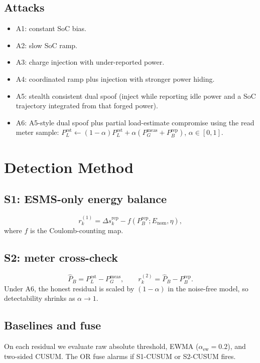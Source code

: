 \documentclass[conference]{IEEEtran}
\begin{document}
\subsection{Attacks}
\begin{itemize}
\item A1: constant SoC bias.
\item A2: slow SoC ramp.
\item A3: charge injection with under-reported power.
\item A4: coordinated ramp plus injection with stronger power hiding.
\item A5: stealth consistent dual spoof (inject while reporting idle power and a SoC trajectory integrated from that forged power).
\item A6: A5-style dual spoof plus partial load-estimate compromise using the read meter sample:
$P_L^{\mathrm{est}}\leftarrow(1-\alpha)P_L^{\mathrm{est}}+\alpha(P_G^{\mathrm{meas}}+P_B^{\mathrm{rep}})$, $\alpha\in[0,1]$.
\end{itemize}

\section{Detection Method}
\subsection{S1: ESMS-only energy balance}
\begin{equation}
r^{(1)}_k = \Delta s^{\mathrm{rep}}_k - f(P_B^{\mathrm{rep}}; E_{\mathrm{nom}},\eta),
\end{equation}
where $f$ is the Coulomb-counting map.

\subsection{S2: meter cross-check}
\begin{equation}
\hat{P}_B = P_L^{\mathrm{est}} - P_G^{\mathrm{meas}}, \qquad
r^{(2)}_k = \hat{P}_B - P_B^{\mathrm{rep}}.
\end{equation}
Under A6, the honest residual is scaled by $(1-\alpha)$ in the noise-free model, so detectability shrinks as $\alpha\to 1$.

\subsection{Baselines and fuse}
On each residual we evaluate raw absolute threshold, EWMA ($\alpha_{\mathrm{ew}}=0.2$), and two-sided CUSUM. The OR fuse alarms if S1-CUSUM or S2-CUSUM fires.
\end{document}
